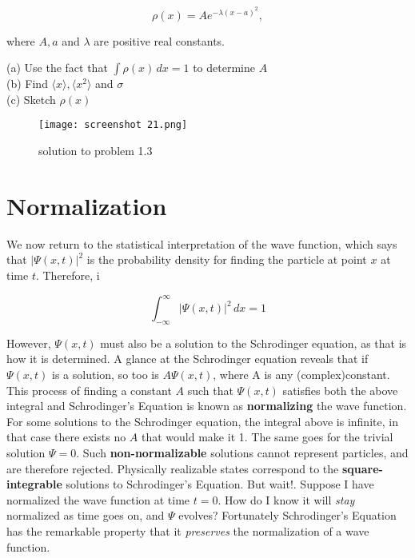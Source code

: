 \documentclass[svgnames]{article}   	%
\begin{document}
\vspace{5px} \[
  \rho(x) = Ae^{-\lambda (x-a)^2}, 
\] \vspace{5px}

where $A, a$ and  $\lambda$ are positive real constants. 

\begin{tcolorbox}	
  
  (a) Use the fact that $\int \rho(x) \, dx = 1$ to determine  $A$ \\
  (b) Find $\langle x \rangle, \langle x^2 \rangle$ and $\sigma$ \\
  (c) Sketch $\rho(x)$

\end{tcolorbox}	

\begin{figure}[H]
  \centering
    \texttt{[image: screenshot 21.png]}
    \caption{solution to problem 1.3}
\end{figure}

\section{Normalization}

We now return to the statistical interpretation of the wave function, which
says that $|\Psi(x,t)|^2$ is the probability density for finding the particle
at point $x$ at time $t$. Therefore, i
\vspace{5px}
\begin{tcolorbox}	
  \[
  \int_{-\infty}^{\infty} |\Psi(x,t)|^2 \, dx = 1 
  \]
\end{tcolorbox}	
\vspace{5px}

However, $\Psi(x,t)$ must also be a solution to the Schrodinger equation, as
that is how it is determined. A glance at the Schrodinger equation reveals that
if $\Psi(x,t)$ is a solution, so too is $A\Psi(x,t)$, where A is any
(complex)constant. This process of finding a constant $A$ such that $\Psi(x,t)$
satisfies both the above integral and Schrodinger's Equation is known as
\textbf{normalizing} the wave function. 
\vspace{5px}
For some solutions to the Schrodinger equation, the integral above is infinite,
in that case there exists no $A$ that would make it 1. The same goes for the
trivial solution $\Psi = 0$. Such \textbf{non-normalizable} solutions cannot
represent particles, and are therefore rejected. Physically realizable states
correspond to the \textbf{square-integrable} solutions to Schrodinger's
Equation. 
\vspace{5px}
But wait!. Suppose I have normalized the wave function at time $t=0$. How do
I know it will \textit{stay} normalized as time goes on, and $\Psi$ evolves?
Fortunately Schrodinger's Equation has the remarkable property that it
\textit{preserves} the normalization of a wave function. 
\vspace{5px}
\end{document}

